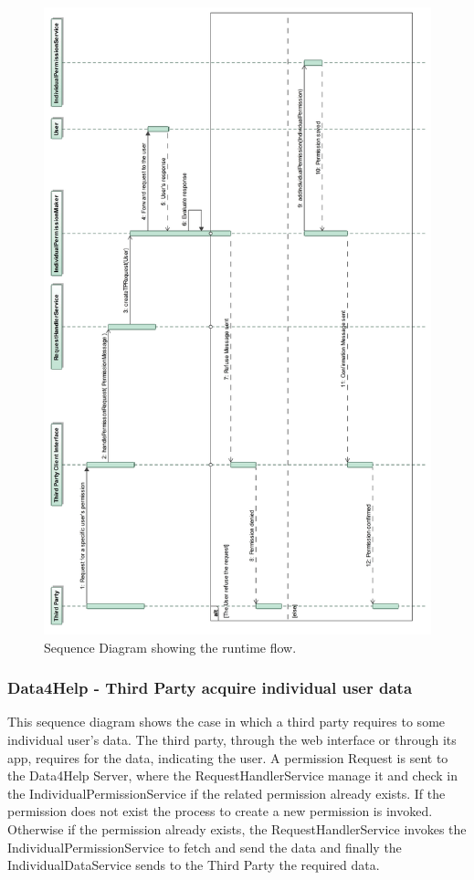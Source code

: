 \documentclass[a4paper]{article}
\begin{document}
\begin{figure}[H]
    \centering
    \includegraphics[width=\linewidth]{SequenceDiagram-RequestForUserIndividualPermission}
    \caption{Sequence Diagram showing the runtime flow.}
    \label{fig:my_label}
\end{figure}
\clearpage

\subsubsection{Data4Help - Third Party acquire individual user data}
This sequence diagram shows the case in which a third party requires to some individual user's data.
The third party, through the web interface or through its app, requires for the data, indicating the user. A permission Request is sent to the Data4Help Server, where the RequestHandlerService manage it and check in the IndividualPermissionService if the related permission already exists.
If the permission does not exist the process to create a new permission is invoked.
Otherwise if the permission already exists, the RequestHandlerService invokes the IndividualPermissionService to fetch and send the data and finally the IndividualDataService sends to the Third Party the required data.
\end{document}
